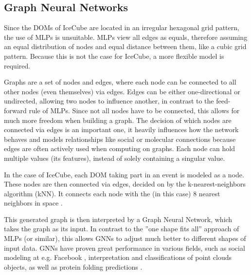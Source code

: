 \documentclass[a4paper,10pt]{scrartcl}
\begin{document}
\subsection{Graph Neural Networks}
\label{gnns}

Since the DOMs of IceCube are located in an irregular hexagonal grid pattern, the use of MLPs is unsuitable.
MLPs view all edges as equals, therefore assuming an equal distribution of nodes and equal distance between them, like a cubic grid pattern.
Because this is not the case for IceCube, a more flexible model is required.

Graphs are a set of nodes and edges, where each node can be connected to all other nodes (even themselves) via edges.
Edges can be either one-directional or undirected, allowing two nodes to influence another, in contrast to the feed-forward rule of MLPs.
Since not all nodes have to be connected, this allows for much more freedom when building a graph.
The decision of which nodes are connected via edges is an important one, it heavily influences how the network behaves and models relationships like social or molecular connections because edges are often actively used when computing on graphs.
Each node can hold multiple values (its features), instead of solely containing a singular value.

In the case of IceCube, each DOM taking part in an event is modeled as a node.
These nodes are then connected via edges, decided on by the k-nearest-neighbors algorithm (kNN).
It connects each node with the (in this case) 8 nearest neighbors in space \cite{rasmus-master}.

This generated graph is then interpreted by a Graph Neural Network, which takes the graph as its input.
In contrast to the ''one shape fits all'' approach of MLPs (or similar), this allows GNNs to adjust much better to different shapes of input data.
GNNs have proven great performance in various fields, such as social modeling at e.g. Facebook \cite{facebook}, interpretation and classifications of point clouds objects, as well as protein folding predictions \cite{STROKACH2020402}.

\end{document}

